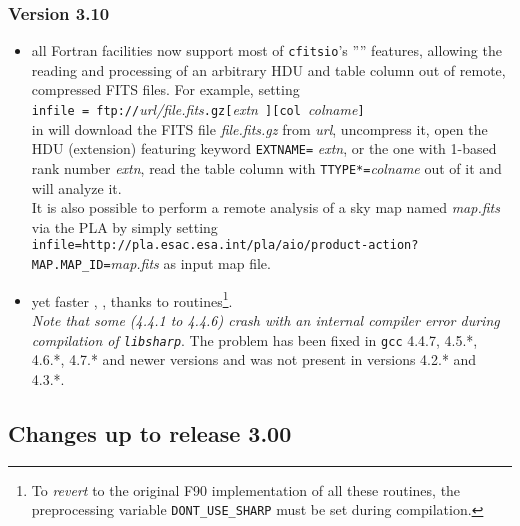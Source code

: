 \documentclass[12pt,twoside]{article}
\newcommand{\compresslist}{%
\setlength{\itemsep}{0ex}}{}
\begin{document}
{\subsubsection{Version 3.10}
\begin{itemize}\compresslist
%
	\item all Fortran facilities now support most of {\tt cfitsio}'s '''' features,
allowing the reading and processing of an arbitrary HDU and table column out of
remote, compressed FITS files. For example, setting \hfill \\
{\tt infile = }{\tt ftp://}{\it url/file.fits}{\tt .gz}{\tt [}{\it extn}{\tt
]}{\tt [col }{\it colname}{\tt ]}  \hfill \\
in 
will download the FITS file {\it file.fits.gz} from {\it url}, 
uncompress it, open the HDU (extension) featuring keyword {\tt EXTNAME=}{\it
extn}, or the one with 1-based rank number {\it extn}, read the table column
with {\tt TTYPE*=}{\it colname} out of it and will analyze it.\\
It is also possible to perform a remote  analysis of a 
sky map named {\it map.fits} via the PLA  by simply setting
{\tt infile=http://pla.esac.esa.int/pla/aio/product-action?MAP.MAP\_ID=}{\it map.fits}
as input map file.
%
	\item yet faster 
,
,
 thanks to  routines\footnote{
To {\em revert} to the original F90 implementation of all these routines, the preprocessing
variable {\tt DONT\_USE\_SHARP} must be set during compilation.}. \\
{\em Note that 
some 
(4.4.1 to 4.4.6) crash with an internal compiler error during compilation of {\tt libsharp}}. 
The problem has been fixed in {\tt gcc} 4.4.7, 4.5.*, 4.6.*, 4.7.* and
newer versions and was not present in versions 4.2.* and 4.3.*.
%
\end{itemize}

\subsection[Changes up to release 3.00]{%
Changes up to release 3.00}
}
\end{document}
